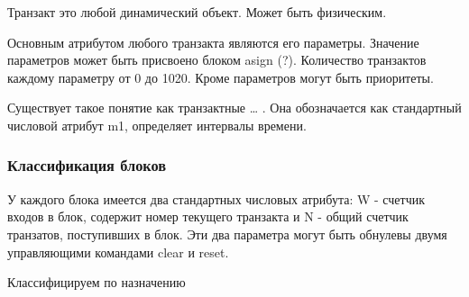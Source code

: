 \documentclass[14pt]{extarticle}
\begin{document}
Транзакт это любой динамический объект. Может быть физическим.

Основным атрибутом любого транзакта являются его параметры. Значение параметров может быть присвоено блоком asign (?). Количество транзактов каждому параметру от 0 до 1020. Кроме параметров могут быть приоритеты.

Существует такое понятие как транзактные … . Она обозначается как стандартный числовой атрибут m1, определяет интервалы времени.

\subsubsection*{Классификация блоков}

У каждого блока имеется два стандартных числовых атрибута: W - счетчик входов в блок, содержит номер текущего транзакта и N - общий счетчик транзатов, поступивших в блок. Эти два параметра могут быть обнулевы двумя управляющими командами clear и reset.

Классифицируем по назначению
\end{document}
